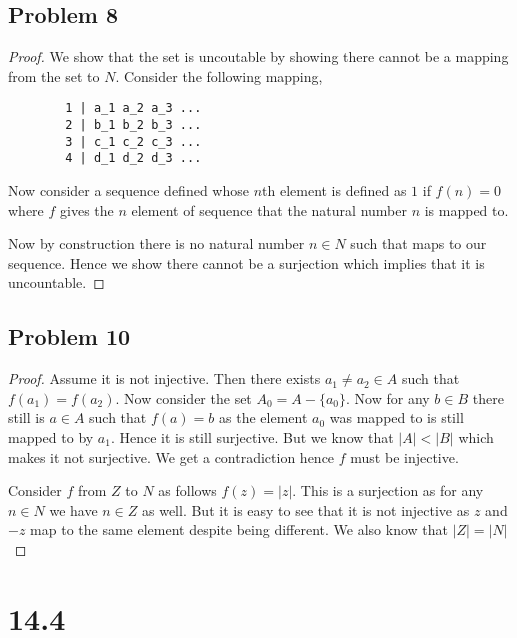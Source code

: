 \documentclass[a4paper]{report}
\begin{document}
\subsection*{Problem 8}
\begin{proof}
    We show that the set is uncoutable by showing there cannot be a mapping from the set to  $N$. Consider the following mapping, 
    \begin{verbatim}
        1 | a_1 a_2 a_3 ...
        2 | b_1 b_2 b_3 ...
        3 | c_1 c_2 c_3 ...
        4 | d_1 d_2 d_3 ...
    \end{verbatim}

    Now consider a sequence defined whose  $n$th element is defined as $1$ if $f(n) = 0$ where  $f$ gives the $n$ element of sequence that the natural number $n$ is mapped to.

    Now by construction there is no natural number $n \in N$ such that maps to our sequence. Hence we show there cannot be a surjection which implies that it is uncountable.
\end{proof}
\subsection*{Problem 10}

\begin{proof}
    Assume it is not injective. Then there exists $a_1\ne a_2 \in A$ such that $f(a_1) = f(a_2)$. Now consider the set $A_0 = A - \{a_0\}$.  Now for any $b \in B$ there still is $a \in A$ such that $f(a) = b$ as the element  $a_0$ was mapped to is still mapped to by $a_1$. Hence it is still surjective. But we know that $|A| < |B|$ which makes it not surjective. We get a contradiction hence $f$ must be injective.

    Consider $f$ from $Z$ to $N$ as follows $f(z) = |z|$. This is a surjection as for any  $n \in N$ we have $n \in Z$ as well. But it is easy to see that it is not injective as $z$ and $-z$ map to the same element despite being different. We also know that $|Z| = |N|$
\end{proof}


\section*{14.4}
\end{document}
